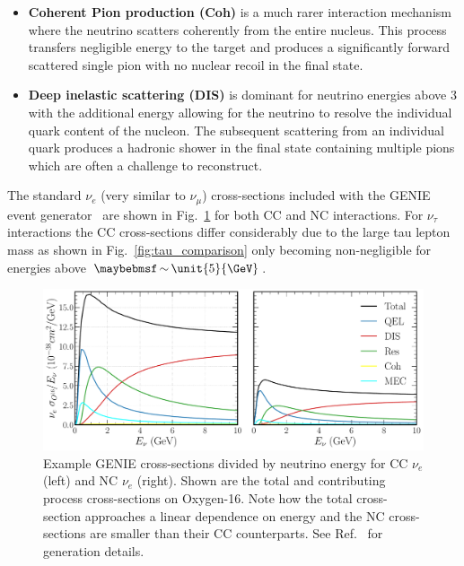 \begin{itemize}
    \item \textbf{Coherent Pion production (Coh)} is a much rarer interaction mechanism where the
          neutrino scatters coherently from the entire nucleus. This process transfers negligible
          energy to the target and produces a significantly forward scattered single pion with no
          nuclear recoil in the final state.

    \item \textbf{Deep inelastic scattering (DIS)} is dominant for neutrino energies above
          \unit{3}{\GeV} with the additional energy allowing for the neutrino to resolve the
          individual quark content of the nucleon. The subsequent scattering from an individual
          quark produces a hadronic shower in the final state containing multiple pions which are
          often a challenge to reconstruct.
\end{itemize}

The standard $\nu_{e}$ (very similar to $\nu_{\mu}$) cross-sections included with the GENIE event
generator~\cite{andreopoulos2009, andreopoulos2015} are shown in Fig.~\ref{fig:xsec_nu_e_O16} for
both CC and NC interactions. For $\nu_{\tau}$ interactions the CC cross-sections differ
considerably due to the large tau lepton mass as shown in Fig.~\ref{fig:tau_comparison} only
becoming non-negligible for energies above $\sim\unit{5}{\GeV}$.

\begin{figure} %
    \includegraphics[width=\textwidth]{diagrams/3-theory/xsec_nu_e_O16.pdf}
    \caption[$\nu_{e}$ cross-sections on Oxygen-16]
    {Example GENIE cross-sections divided by neutrino energy for CC $\nu_{e}$ (left) and NC
        $\nu_{e}$ (right). Shown are the total and contributing process cross-sections on
        Oxygen-16. Note how the total cross-section approaches a linear dependence on energy and
        the NC cross-sections are smaller than their CC counterparts. See
        Ref.~\cite{andreopoulos2015} for generation details.}
    \label{fig:xsec_nu_e_O16}
\end{figure}

